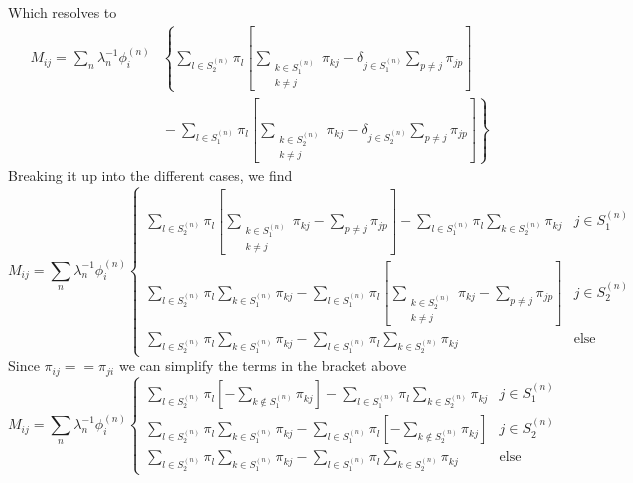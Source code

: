 \documentclass[a4paper]{article}
\newcommand{\evec}[2]{\phi^{(#2)}_{#1}}
\begin{document}
Which resolves to
\begin{align}
M_{ij} = 
\sum_n \lambda_n^{-1} \evec{i}{n} 
& \left\{ 
  \sum_{l \in S_2^{(n)}}   \pi_l
  \left[
  \sum_{\substack{k \in S_1^{(n)} \\ k \ne j}} 
  \pi_{kj}
   - \delta_{j \in S_1^{(n)}}
   \sum_{p \ne j} \pi_{jp}
  \right]
  \right. \\ & \left. 
  {} - \sum_{l \in S_1^{(n)}} \pi_l
  \left[
  \sum_{\substack{k \in S_2^{(n)} \\ k \ne j}} 
  \pi_{kj}
   - \delta_{j \in S_2^{(n)}}
   \sum_{p \ne j} \pi_{jp}
  \right]
\right\}
\end{align}
Breaking it up into the different cases, we find
\begin{equation}
M_{ij} = \sum_n \lambda_n^{-1} \evec{i}{n} 
\begin{cases}
\sum_{l \in S_2^{(n)}} \pi_l
  \left[
  \sum_{\substack{k \in S_1^{(n)} \\ k \ne j}} 
  \pi_{kj}
   - \sum_{p \ne j} \pi_{jp} 
  \right]
  - \sum_{l \in S_1^{(n)}} \pi_l \sum_{k \in S_2^{(n)}}  \pi_{kj}
 & j \in S_1^{(n)} \\
\sum_{l \in S_2^{(n)}} \pi_l \sum_{k \in S_1^{(n)}}  \pi_{kj}
-  \sum_{l \in S_1^{(n)}} \pi_l 
\left[
  \sum_{\substack{k \in S_2^{(n)} \\ k \ne j}} 
  \pi_{kj}
   - \sum_{p \ne j} \pi_{jp} 
  \right]
& j \in S_2^{(n)} \\
\sum_{l \in S_2^{(n)}} \pi_l \sum_{k \in S_1^{(n)}}  \pi_{kj}
- 
\sum_{l \in S_1^{(n)}} \pi_l \sum_{k \in S_2^{(n)}}  \pi_{kj}
& \text{else}
\end{cases}
\end{equation}
Since $\pi_{ij} == \pi_{ji}$ we can simplify the terms in the bracket above
\begin{equation}
M_{ij} = \sum_n \lambda_n^{-1} \evec{i}{n} 
\begin{cases}
\sum_{l \in S_2^{(n)}} \pi_l
  \left[-
  \sum_{k \notin S_1^{(n)}} 
  \pi_{kj}
  \right]
  - \sum_{l \in S_1^{(n)}} \pi_l \sum_{k \in S_2^{(n)}}  \pi_{kj}
 & j \in S_1^{(n)} \\
\sum_{l \in S_2^{(n)}} \pi_l \sum_{k \in S_1^{(n)}}  \pi_{kj}
-  \sum_{l \in S_1^{(n)}} \pi_l 
\left[-
  \sum_{k \notin S_2^{(n)}} 
  \pi_{kj}
  \right]
& j \in S_2^{(n)} \\
\sum_{l \in S_2^{(n)}} \pi_l \sum_{k \in S_1^{(n)}}  \pi_{kj}
- 
\sum_{l \in S_1^{(n)}} \pi_l \sum_{k \in S_2^{(n)}}  \pi_{kj}
& \text{else}
\end{cases}
\end{equation}
\end{document}
